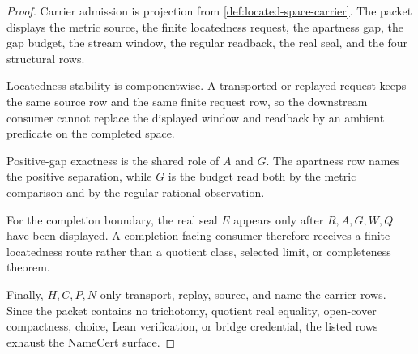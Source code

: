 \begin{proof}
Carrier admission is projection from \autoref{def:located-space-carrier}. The packet displays the metric source, the finite locatedness request, the apartness gap, the gap budget, the stream window, the regular readback, the real seal, and the four structural rows.

Locatedness stability is componentwise. A transported or replayed request keeps the same source row and the same finite request row, so the downstream consumer cannot replace the displayed window and readback by an ambient predicate on the completed space.

Positive-gap exactness is the shared role of $A$ and $G$. The apartness row names the positive separation, while $G$ is the budget read both by the metric comparison and by the regular rational observation.

For the completion boundary, the real seal $E$ appears only after $R,A,G,W,Q$ have been displayed. A completion-facing consumer therefore receives a finite locatedness route rather than a quotient class, selected limit, or completeness theorem.

Finally, $H,C,P,N$ only transport, replay, source, and name the carrier rows. Since the packet contains no trichotomy, quotient real equality, open-cover compactness, choice, Lean verification, or bridge credential, the listed rows exhaust the NameCert surface.
\end{proof}

